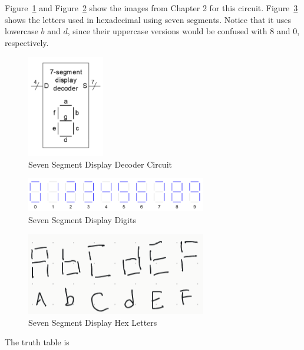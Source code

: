 \documentclass[12pt]{article}
\newenvironment{sol}[1][Solution]{\begin{trivlist}
		\item[\hskip \labelsep {\bfseries #1:}]}{\end{trivlist}}
\begin{document}
\begin{sol}
	Figure~\ref{seven-segment-display-decoder} and Figure~\ref{seven-segment-display-digits}
	show the images from Chapter 2 for this circuit. Figure~\ref{04-06-seven-segment-display-hex-letters}
	shows the letters used in hexadecimal using seven segments. Notice that it uses
	lowercase $b$ and $d$, since their uppercase versions would be confused with $8$ and $0$,
	respectively.
	\begin{figure}
		\centering
		\includegraphics[width=0.3\textwidth]{seven-segment-display-decoder}
		\caption{Seven Segment Display Decoder Circuit}
		\label{seven-segment-display-decoder}
	\end{figure}
	\begin{figure}
		\centering
		\includegraphics[width=0.7\textwidth]{seven-segment-display-digits}
		\caption{Seven Segment Display Digits}
		\label{seven-segment-display-digits}
	\end{figure}
	\begin{figure}
		\centering
		\includegraphics[width=0.7\textwidth]{04-06-seven-segment-display-hex-letters}
		\caption{Seven Segment Display Hex Letters}
		\label{04-06-seven-segment-display-hex-letters}
	\end{figure}
	The truth table is
	\begin{center}
		\begin{tabular}{c|ccccccc}

\end{tabular}
\end{center}
\end{sol}
\end{document}
